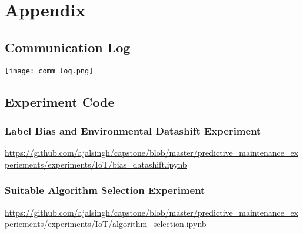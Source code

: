 \appendix
\chapter{Appendix}

\section{Communication Log}
\begin{table}[H]
    \texttt{[image: comm\_log.png]}
    \centering
\end{table}

\section{Experiment Code}
\subsection{Label Bias and Environmental Datashift Experiment}
\url{https://github.com/ajalsingh/capstone/blob/master/predictive_maintenance_experiements/experiments/IoT/bias_datashift.ipynb}

\subsection{Suitable Algorithm Selection Experiment}
\url{https://github.com/ajalsingh/capstone/blob/master/predictive_maintenance_experiements/experiments/IoT/algorithm_selection.ipynb}


